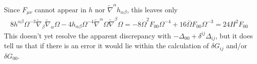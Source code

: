 \documentclass[10pt,letterpaper]{article}
\numberwithin{equation}{section}
\begin{document}
Since $F_{\mu\nu}$ cannot appear in $h$ nor $\tilde \nabla^\alpha h_{\alpha\beta}$, this leaves only
\begin{eqnarray}
8 h^{\alpha \beta } \Omega^{-3} \tilde{\nabla}_{\beta }\tilde{\nabla}_{\alpha }\Omega - 4 h_{\alpha \beta } \Omega^{-4} \tilde{\nabla}^{\alpha }\Omega \tilde{\nabla}^{\beta }\Omega = -8 \dot{\Omega}^2 F_{00}{} \Omega^{-4} + 16 \overset{..}{\Omega} F_{00}{} \Omega^{-3} = 24H^2 F_{00}
\end{eqnarray}
This doesn't yet resolve the apparent discrepancy with $-\Delta_{00} + \delta^{ij}\Delta_{ij}$, but it does tell us that if there is an error it would lie within the calculation of $\delta G_{ij}$ and/or $\delta G_{00}$. 
\end{document}
